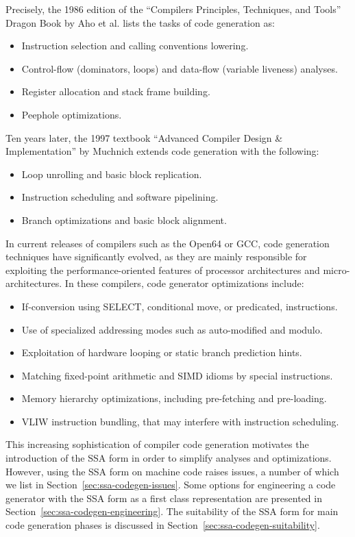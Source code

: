 Precisely, the 1986 edition of
the ``Compilers Principles, Techniques, and Tools'' Dragon Book by Aho et al.
lists the tasks of code generation as:
\begin{itemize}
\item Instruction selection and calling conventions lowering.
\item Control-flow (dominators, loops) and data-flow (variable liveness) analyses.
\item Register allocation and stack frame building.
\item Peephole optimizations.
\end{itemize}
Ten years later, the 1997 textbook ``Advanced Compiler Design \& Implementation''
by Muchnich extends code generation with the following: \begin{itemize}
\item Loop unrolling and basic block replication.
\item Instruction scheduling and software pipelining.
\item Branch optimizations and basic block alignment.
\end{itemize}
In current releases of compilers such as the Open64 or GCC, code generation
techniques have significantly evolved, as they are mainly responsible for
exploiting the performance-oriented features of processor architectures and
micro-architectures. In these compilers, code generator optimizations
include: \begin{itemize}
\item If-conversion using SELECT, conditional move, or predicated, instructions.
\item Use of specialized addressing modes such as auto-modified and modulo.
\item Exploitation of hardware looping or static branch prediction hints.
\item Matching fixed-point arithmetic and SIMD idioms by special instructions.
\item Memory hierarchy optimizations, including pre-fetching and pre-loading.
\item VLIW instruction bundling, that may interfere with instruction
scheduling.
\end{itemize}

This increasing sophistication of compiler code generation motivates the
introduction of the SSA form in order to simplify analyses and optimizations.
However, using the SSA form on machine code raises issues, a number of
which we list in Section~\ref{sec:ssa-codegen-issues}.  Some options for
engineering a code generator with the SSA form as a first class representation
are presented in Section~\ref{sec:ssa-codegen-engineering}.  The suitability of
the SSA form for main code generation phases is discussed in
Section~\ref{sec:ssa-codegen-suitability}.


